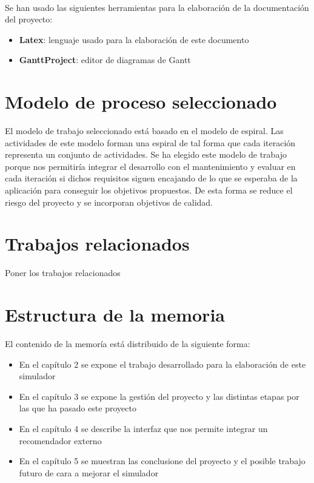        \vspace{0.7cm}
\\
\thispagestyle{empty}

Se han usado las siguientes herramientas para la elaboración de la documentación del proyecto:

\begin{itemize}
       \item {\bfseries Latex}: lenguaje usado para la elaboración de este documento
       \item {\bfseries GanttProject}: editor de diagramas de Gantt
\end{itemize}


\section{Modelo de proceso seleccionado}
\thispagestyle{empty}


El modelo de trabajo seleccionado está basado en el modelo de espiral. Las actividades de este modelo forman una espiral de tal forma que cada iteración representa un conjunto de actividades. Se ha elegido este modelo de trabajo porque nos permitiría integrar el desarrollo con el mantenimiento y evaluar en cada iteración si dichos requisitos siguen encajando de lo que se esperaba de la aplicación para conseguir los objetivos propuestos. De esta forma se reduce el riesgo del proyecto y se incorporan objetivos de calidad.


\section{Trabajos relacionados}
\thispagestyle{empty}


Poner los trabajos relacionados


\section{Estructura de la memoria}
\thispagestyle{empty}

El contenido de la memoría está distribuido de la siguiente forma:

\begin{itemize}
	\item En el capítulo 2 se expone el trabajo desarrollado para la elaboración de este simulador
	\item En el capítulo 3 se expone la gestión del proyecto y las distintas etapas por las que ha pasado este proyecto
       \item En el capítulo 4 se describe la interfaz que nos permite integrar un recomendador externo
	\item En el capítulo 5 se muestran las conclusione del proyecto y el posible trabajo futuro de cara a mejorar el simulador 
\end{itemize}